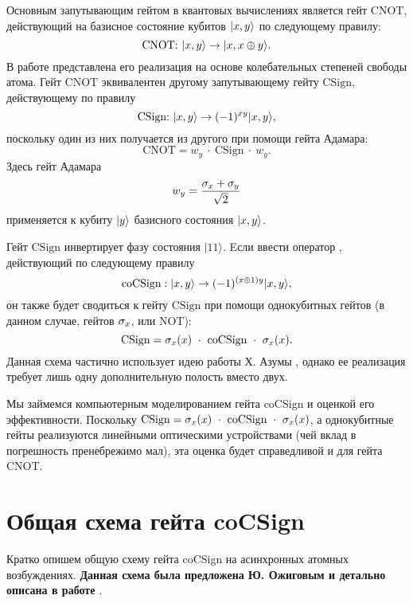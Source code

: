 Основным запутывающим гейтом в квантовых вычислениях является гейт CNOT, действующий на базисное состояние кубитов $|x, y\rangle$ по следующему правилу:
\[
\text{CNOT:}~|x, y\rangle \rightarrow |x, x \oplus y\rangle.
\]
В работе \cite{monroe} представлена его реализация на основе колебательных степеней свободы атома. Гейт $\text{CNOT}$ эквивалентен другому запутывающему гейту $\text{CSign}$, действующему по правилу
\[
\text{CSign:}~|x, y\rangle \rightarrow (-1)^{xy}|x, y\rangle,
\]
поскольку один из них получается из другого при помощи гейта Адамара:
\[
\text{CNOT} = w_{y}~\cdot~\text{CSign}~\cdot~w_{y}.
\]
Здесь гейт Адамара 
\[
\displaystyle w_{y} = \frac{\sigma_{x} + \sigma_{y}}{\sqrt{2}}
\]
применяется к кубиту $|y\rangle$ базисного состояния $|x, y\rangle$.

Гейт $\text{CSign}$ инвертирует фазу состояния $|11\rangle$. Eсли ввести оператор , действующий по следующему правилу
\[
\text{coCSign}: |x, y\rangle \rightarrow (-1)^{(x \oplus 1)y}|x, y\rangle,
\]
он также будет сводиться к гейту $\text{CSign}$ при помощи однокубитных гейтов (в данном случае, гейтов $\sigma_{x}$, или $\text{NOT}$):
\[
\text{CSign} = \sigma_{x}(x)~\cdot~\text{coCSign}~\cdot~\sigma_{x}(x).
\]
\indent Данная схема частично использует идею работы Х. Азумы \cite{azuma}, однако ее реализация требует лишь одну дополнительную полость вместо двух.

Мы займемся компьютерным моделированием гейта coCSign и оценкой его эффективности. Поскольку $\text{CSign} = \sigma_{x}(x)~\cdot~\text{coCSign}~\cdot~\sigma_{x}(x)$, а однокубитные гейты реализуются линейными оптическими устройствами (чей вклад в погрешность пренебрежимо мал), эта оценка будет справедливой и для гейта $\text{CNOT}$.

\clearpage
\section{Общая схема гейта coCSign}\label{sec:ch5/sect2}

Кратко опишем общую схему гейта coCSign на асинхронных атомных возбуждениях. \textbf{Данная схема была предложена Ю. Ожиговым и детально описана в работе \cite{ozhigov_quantum_gates}}.


